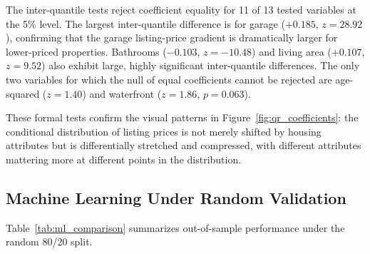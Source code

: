 The inter-quantile tests reject coefficient equality for 11 of 13 tested variables at the 5\% level. The largest inter-quantile difference is for garage ($+0.185$, $z = 28.92$), confirming that the garage listing-price gradient is dramatically larger for lower-priced properties. Bathrooms ($-0.103$, $z = -10.48$) and living area ($+0.107$, $z = 9.52$) also exhibit large, highly significant inter-quantile differences. The only two variables for which the null of equal coefficients cannot be rejected are age-squared ($z = 1.40$) and waterfront ($z = 1.86$, $p = 0.063$).

These formal tests confirm the visual patterns in Figure~\ref{fig:qr_coefficients}: the conditional distribution of listing prices is not merely shifted by housing attributes but is differentially stretched and compressed, with different attributes mattering more at different points in the distribution.


\subsection{Machine Learning Under Random Validation}
\label{sec:ml_random}

Table~\ref{tab:ml_comparison} summarizes out-of-sample performance under the random 80/20 split.

